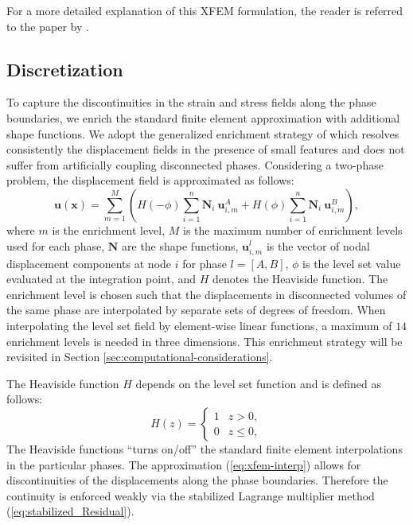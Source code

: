 For a more detailed explanation of this XFEM formulation, the reader is referred to the paper by \citet{MM:13}.


\subsection{Discretization}
\label{sec:discretization}

To capture the discontinuities in the strain and stress fields along the phase boundaries, we enrich the standard finite element approximation with additional shape functions. We adopt the generalized enrichment strategy of \citet{MM:13} which resolves consistently the displacement fields in the presence of small features and does not suffer from artificially coupling disconnected phases. Considering a two-phase problem, the displacement field is approximated as follows:
%
\begin{equation}
\label{eq:xfem-interp}
	\mathbf{u}(\mathbf{x}) = \sum \limits^{M}_{m=1} \left( H(-\phi) \sum\limits^{n}_{i=1} \mathbf{N}_i \ \mathbf{u}_{i,m}^A
														 + H( \phi) \sum\limits^{n}_{i=1} \mathbf{N}_i \ \mathbf{u}_{i,m}^B \right),
\end{equation}
%
where $m$ is the enrichment level, $M$ is the maximum number of enrichment levels used for each phase, $\mathbf{N}$ are the shape functions, $\mathbf{u}^l_{i,m}$ is the vector of nodal displacement components at node $i$ for phase $l=[A,B]$, $\phi$ is the level set value evaluated at the integration point, and $H$ denotes the Heaviside function. The enrichment level is chosen such that the displacements in disconnected volumes of the same phase are interpolated by separate sets of degrees of freedom. When interpolating the level set field by element-wise linear functions, a maximum of $14$ enrichment levels is needed in three dimensions. This enrichment strategy will be revisited in Section \ref{sec:computational-considerations}.

The Heaviside function $H$ depends on the level set function and is defined as follows:
%
\begin{equation}
\label{eq:heaviside}
	H(z) =
		\begin{cases}
			1 & z > 0, \\
			0 & z \le 0,
		\end{cases}
\end{equation}
%
The Heaviside functions ``turns on/off'' the standard finite element interpolations in the particular phases. The approximation (\ref{eq:xfem-interp}) allows for discontinuities of the displacements along the phase boundaries. Therefore the continuity is enforced weakly via the stabilized Lagrange multiplier method (\ref{eq:stabilized_Residual}).

